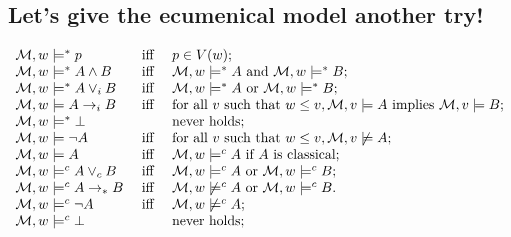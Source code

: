 \subsection{Let's give the ecumenical model another try!}

\noindent
$
\begin{array}{l@{\quad}c@{\quad}l}
\m,w\modelss p & \mbox{ iff } & p\in \val(w);\\
\m,w\modelss A\wedge B & \mbox{ iff } & \m,w\modelss A \mbox{ and } \m,w\modelss B;\\
\m,w\modelss A\vee_i B & \mbox{ iff } & \m,w\modelss A \mbox{ or } \m,w\modelss B;\\
\m,w\models A\iimp B & \mbox{ iff } & \text{for all } v \text{ such that  }w \leq v,   
\m,v\models A \mbox{ implies }  \m,v\models B;\\
\m,w \modelss \bot & & \mbox{never holds};\\
\m,w\models \neg A & \mbox{ iff } &    \text{for all } v \text{ such that  }w \leq v, \m,v\not\models A ;\\
\m,w\models A & \mbox{ iff } & \m,w\modelsc A \mbox{ if $A$ is classical};\\
\m,w\modelsc A\vee_c B & \mbox{ iff } & \m,w\modelsc A \mbox{ or } \m,w\modelsc B;\\
\m,w\modelsc A\to_* B & \mbox{ iff } & \m,w\not\modelsc  A \mbox{ or } \m,w\modelsc B.\\
\m,w\modelsc \neg A & \mbox{ iff } &   \m,w\not\modelsc A;\\
\m,w \modelsc \bot & & \mbox{never holds};
\end{array}
$
